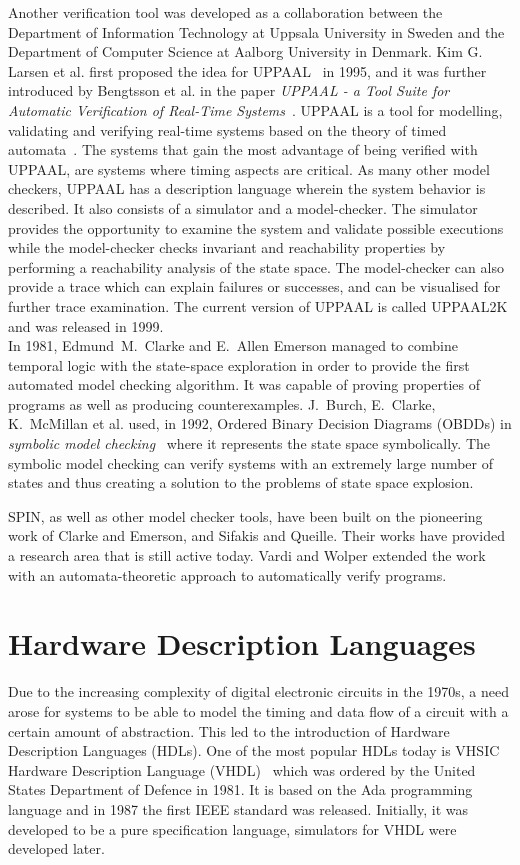 Another verification tool was developed as a collaboration between the Department of Information Technology at Uppsala University in Sweden and the Department of Computer Science at Aalborg University in Denmark. Kim G. Larsen et al. first proposed the idea for UPPAAL~\cite{Larsen1995} in 1995, and it was further introduced by Bengtsson et al. in the paper \textit{UPPAAL - a Tool Suite for Automatic Verification of Real-Time Systems}~\cite{Bengtsson1995}.
UPPAAL is a tool for modelling, validating and verifying real-time systems based on the theory of timed automata~\cite{Alur1990}.
The systems that gain the most advantage of being verified with UPPAAL, are systems where timing aspects are critical.
As many other model checkers, UPPAAL has a description language wherein the system behavior is described. It also consists of a simulator and a model-checker. The simulator provides the opportunity to examine the system and validate possible executions while the model-checker checks invariant and reachability properties by performing a reachability analysis of the state space. The model-checker can also provide a trace which can explain failures or successes, and can be visualised for further trace examination.
The current version of UPPAAL is called UPPAAL2K and was released in 1999\cite{Amnell2001}.\\

In 1981, Edmund~M.~Clarke and E.~Allen Emerson managed to combine temporal logic with the state-space exploration in order to provide the first automated model checking algorithm\cite{Clarke1981}. It was capable of proving properties of programs as well as producing counterexamples.
J.~Burch, E.~Clarke, K.~McMillan et al. used, in 1992, Ordered Binary Decision Diagrams (OBDDs) in \textit{symbolic model checking}~\cite{Burch1992} where it represents the state space symbolically. The symbolic model checking can verify systems with an extremely large number of states and thus creating a solution to the problems of state space explosion.

SPIN, as well as other model checker tools, have been built on the pioneering work of Clarke and Emerson\cite{Clarke1981}, and Sifakis and Queille\cite{Queille1982}. Their works have provided a research area that is still active today. Vardi and Wolper extended the work with an automata-theoretic approach to automatically verify programs\cite{Vardi1986}.\\

\section{Hardware Description Languages}
Due to the increasing complexity of digital electronic circuits in the 1970s, a need arose for systems to be able to model the timing and data flow of a circuit with a certain amount of abstraction. This led to the introduction of Hardware Description Languages (HDLs). One of the most popular HDLs today is VHSIC Hardware Description Language (VHDL)~\cite{VHDL} which was ordered by the United States Department of Defence in 1981. It is based on the Ada programming language and in 1987 the first IEEE standard was released. Initially, it was developed to be a pure specification language, simulators for VHDL were developed later.

